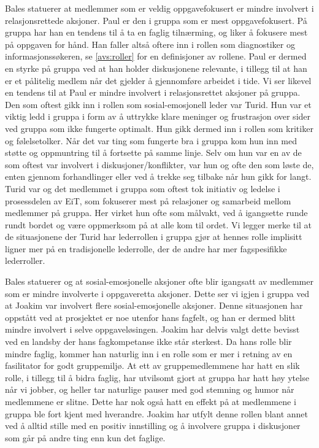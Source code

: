 Bales statuerer at medlemmer som er veldig oppgavefokusert er mindre involvert i 
relasjonsrettede aksjoner. Paul er den i gruppa som er mest oppgavefokusert. 
På gruppa har han en tendens til å ta en faglig tilnærming, og liker å fokusere mest 
på oppgaven for hånd. Han faller altså oftere inn i rollen som diagnostiker og 
informasjonssøkeren, se \cref{avs:roller} for en definisjoner av rollene. Paul er dermed en styrke på gruppa ved at han holder 
diskusjonene relevante, i tillegg til at han er et pålitelig medlem når det gjelder 
å gjennomføre arbeidet i tide. Vi ser likevel en tendens til at Paul er mindre involvert 
i relasjonsrettet aksjoner på gruppa. 
Den som oftest gikk inn i rollen som sosial-emosjonell leder var Turid. Hun var et viktig 
ledd i gruppa i form av å uttrykke klare meninger og frustrasjon over sider ved gruppa
som ikke fungerte optimalt. Hun gikk dermed inn i rollen som kritiker og følelsetolker.
Når det var ting som fungerte bra i gruppa kom hun inn med støtte og oppmuntring til å 
fortsette på samme linje. Selv om hun var en av de som oftest var involvert i diskusjoner/konflikter,
var hun og ofte den som løste de, enten gjennom forhandlinger eller ved å trekke seg tilbake
når hun gikk for langt. Turid var og det medlemmet i gruppa som oftest tok initiativ og ledelse 
i prosessdelen av EiT, som fokuserer mest på relasjoner og samarbeid mellom medlemmer på gruppa. 
Her virket hun ofte som målvakt, ved å igangsette runde rundt bordet og være oppmerksom på 
at alle kom til ordet. Vi legger merke til at de situasjonene der Turid har
lederrollen i gruppa gjør at hennes rolle implisitt ligner mer på en tradisjonelle lederrolle, der de
andre har mer fagspesifikke lederroller. 

Bales statuerer og at sosial-emosjonelle aksjoner ofte blir igangsatt av medlemmer som er 
mindre involverte i oppgaveretta aksjoner. Dette ser vi igjen i gruppa ved at Joakim var 
involvert flere sosial-emosjonelle aksjoner. Denne situasjonen har oppstått ved at prosjektet 
er noe utenfor hans fagfelt, og han er dermed blitt mindre involvert i selve oppgaveløsingen. 
Joakim har delvis valgt dette bevisst ved en landsby der hans fagkompetanse ikke
står sterkest. Da hans rolle blir mindre faglig, kommer han naturlig inn i en
rolle som er mer i retning av en fasilitator for godt gruppemiljø. At ett av
gruppemedlemmene har hatt en slik rolle, i tillegg til å bidra faglig, har
utvilsomt gjort at gruppa har hatt høy ytelse når vi jobber, og heller tar
naturlige pauser med god stemning og humor når medlemmene er slitne. Dette har
nok også hatt en effekt på at medlemmene i gruppa ble fort kjent med hverandre.
Joakim har utfylt denne rollen blant annet ved å alltid stille med en positiv innstilling og 
å involvere gruppa i diskusjoner som går på andre ting enn kun det faglige.


